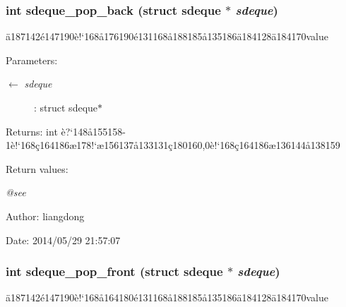 \subsubsection{\setlength{\rightskip}{0pt plus 5cm}int sdeque\_\-pop\_\-back (struct sdeque $\ast$ {\em sdeque})}\label{sdeque_8h_a6}


\"{a}187142\'{e}147190\`{e}!`168\aa{}176190\'{e}131168\aa{}188185\aa{}135186\"{a}184128\"{a}184170value 

\begin{Desc}
\item[Parameters:]
\begin{description}
\item[\mbox{$\leftarrow$} {\em sdeque}]: struct sdeque$\ast$ \end{description}
\end{Desc}
\begin{Desc}
\item[Returns:]int \`{e}?`148\aa{}155158-1\`{e}!`168\c{c}164186\ae{}178!`\ae{}156137\aa{}133131\c{c}180160,0\`{e}!`168\c{c}164186\ae{}136144\aa{}138159 \end{Desc}
\begin{Desc}
\item[Return values:]
\begin{description}
\item[{\em @see}]\end{description}
\end{Desc}
\begin{Desc}
\item[Author:]liangdong \end{Desc}
\begin{Desc}
\item[Date:]2014/05/29 21:57:07 \end{Desc}
\subsubsection{\setlength{\rightskip}{0pt plus 5cm}int sdeque\_\-pop\_\-front (struct sdeque $\ast$ {\em sdeque})}\label{sdeque_8h_a3}


\"{a}187142\'{e}147190\`{e}!`168\aa{}164180\'{e}131168\aa{}188185\aa{}135186\"{a}184128\"{a}184170value 

